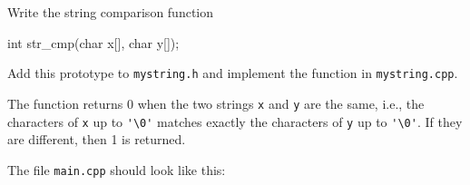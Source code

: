 Write the string comparison function
{\small
\begin{console}
int str_cmp(char x[], char y[]);
\end{console}
}
Add this prototype to \verb!mystring.h!
and implement the function in \verb!mystring.cpp!.

The function returns 0 when the two strings \verb!x! and \verb!y!
are the same, i.e., the characters of \verb!x! up to \verb!'\0'! 
matches exactly the characters of \verb!y! up to \verb!'\0'!.
If they are different, then 1 is returned.

The file \verb!main.cpp! should look like this:


